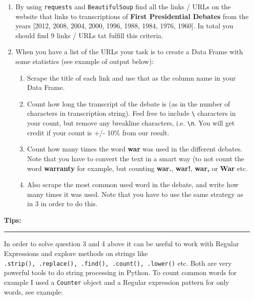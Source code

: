 \documentclass[11pt]{article}
\providecommand{\tightlist}{%
      \setlength{\itemsep}{0pt}\setlength{\parskip}{0pt}}
\begin{document}
\begin{enumerate}
\def\labelenumi{\arabic{enumi}.}
\tightlist
\item
  By using \texttt{requests} and \texttt{BeautifulSoup} find all the
  links / URLs on the website that links to transcriptions of
  \textbf{First Presidential Debates} from the years {[}2012, 2008,
  2004, 2000, 1996, 1988, 1984, 1976, 1960{]}. In total you should find
  9 links / URLs tat fulfill this criteria.
\item
  When you have a list of the URLs your task is to create a Data Frame
  with some statistics (see example of output below):

  \begin{enumerate}
  \def\labelenumii{\arabic{enumii}.}
  \tightlist
  \item
    Scrape the title of each link and use that as the column name in
    your Data Frame.
  \item
    Count how long the transcript of the debate is (as in the number of
    characters in transcription string). Feel free to include
    \texttt{\textbackslash{}} characters in your count, but remove any
    breakline characters, i.e. \texttt{\textbackslash{}n}. You will get
    credit if your count is +/- 10\% from our result.
  \item
    Count how many times the word \textbf{war} was used in the different
    debates. Note that you have to convert the text in a smart way (to
    not count the word \textbf{warranty} for example, but counting
    \textbf{war.}, \textbf{war!}, \textbf{war,} or \textbf{War} etc.
  \item
    Also scrape the most common used word in the debate, and write how
    many times it was used. Note that you have to use the same strategy
    as in 3 in order to do this.
  \end{enumerate}
\end{enumerate}

\textbf{Tips:}

\begin{center}\rule{0.5\linewidth}{\linethickness}\end{center}

In order to solve question 3 and 4 above it can be useful to work with
Regular Expressions and explore methods on strings like
\texttt{.strip(),\ .replace(),\ .find(),\ .count(),\ .lower()} etc. Both
are very powerful tools to do string processing in Python. To count
common words for example I used a \texttt{Counter} object and a Regular
expression pattern for only words, see example:
\end{document}
